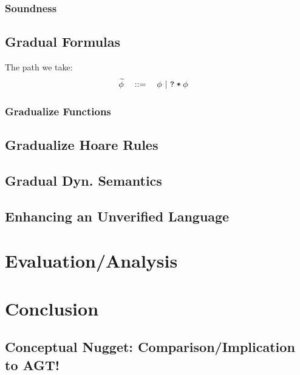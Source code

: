     \subsection{Soundness}

\section{Gradual Formulas}
The path we take:
\begin{align*}
&\widetilde{\phi} \quad ::= \quad \phi ~|~ \texttt{\texttt{?}\:*\:\ensuremath{\phi}}
\end{align*}

\subsection{Gradualize Functions}

\section{Gradualize Hoare Rules}

\section{Gradual Dyn. Semantics}


\section{Enhancing an Unverified Language}





\chapter{Evaluation/Analysis}
\label{ch:evaluation-analysis}


\chapter{Conclusion}
\label{ch:conclusion}


\section{Conceptual Nugget: Comparison/Implication to AGT!}

